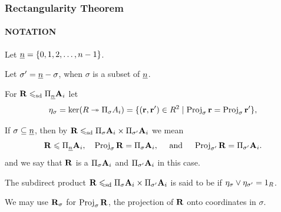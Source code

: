 \documentclass[9pt,xcolor=dvipsnames%
   ]{beamer}
\begin{document}
\begin{frame} \frametitle{Rectangularity Theorem}
  \framesubtitle{NOTATION}

  Let $\underline{n} =\{0, 1, 2, \dots, n-1\}$.

  \bigskip

  Let $\sigma' = \underline{n} -\sigma$, when $\sigma$ is a subset of $\underline{n}$.

  \bigskip

  For $\mathbf{R} \leqslant_{\mathrm{sd}} \Pi_{\underline{n}}\mathbf{A}_i$ %
  let
  \[
  \eta_\sigma = \ker(R \twoheadrightarrow \Pi_\sigma A_i) = \{(\mathbf{r}, \mathbf{r}') \in R^2 \mid
  \operatorname{Proj}_\sigma \mathbf{r} = \operatorname{Proj}_\sigma \mathbf{r}' \},
  \]


  If $\sigma\subseteq \underline{n}$, then by
  $\mathbf{R} \leqslant_{\mathrm{sd}} \Pi_\sigma \mathbf{A}_i \times \Pi_{\sigma'}\mathbf{A}_i$ we 
  mean
  \[
  \mathbf{R}\leqslant \Pi_{\underline{n}} \mathbf{A}_i, \quad 
\operatorname{Proj}_\sigma\mathbf{R} = \Pi_\sigma \mathbf{A}_i, \quad \text{ and }\quad
\operatorname{Proj}_{\sigma'}\mathbf{R} = \Pi_{\sigma'} \mathbf{A}_i.
\]
  and we say that $\mathbf{R}$ is a  
  $\Pi_\sigma \mathbf{A}_i$ and $\Pi_{\sigma'}\mathbf{A}_i$ in this case.

  \bigskip 

  The subdirect product $\mathbf{R} \leqslant_{\mathrm{sd}} \Pi_\sigma \mathbf{A}_i \times
  \Pi_{\sigma'}\mathbf{A}_i$ 
  is said to be  if $\eta_\sigma \vee \eta_{\sigma'} = 1_R$.

  \bigskip

  We may use $\mathbf{R}_\sigma$ for $\operatorname{Proj}_\sigma\mathbf{R}$, the projection 
  of $\mathbf{R}$ onto coordinates in $\sigma$.

  
\end{frame}
\end{document}

